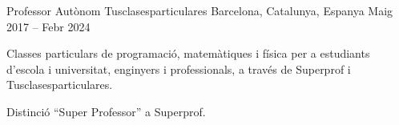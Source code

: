 \begin{cventries}
\vspace{3mm}
\cventry
  {Professor Autònom}
  {Tusclasesparticulares}
  {Barcelona, Catalunya, Espanya}
  {Maig 2017 -- Febr 2024}
  {
   \begin{cvitems}
    \item {Classes particulars de programació, matemàtiques i física per a estudiants d'escola i universitat, enginyers i professionals, a través de Superprof i Tusclasesparticulares.}
    \item {Distinció ``Super Professor'' a Superprof.}
   \end{cvitems}
  }



\end{cventries}
